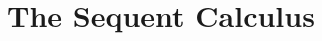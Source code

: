 \documentclass[open-logic-chapter]{subfiles}
\begin{document}
\chapter{The Sequent Calculus}









\OLEndChapterHook
\end{document}
